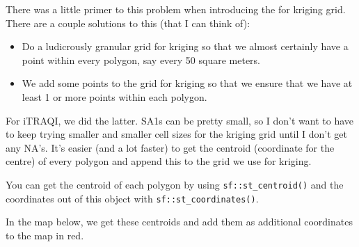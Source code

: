 \documentclass[
]{book}
\providecommand{\tightlist}{%
  \setlength{\itemsep}{0pt}\setlength{\parskip}{0pt}}
\begin{document}
There was a little primer to this problem when introducing the for kriging grid.
There are a couple solutions to this (that I can think of):

\begin{itemize}
\tightlist
\item
  Do a ludicrously granular grid for kriging so that we almost certainly have a point within every polygon, say every 50 square meters.
\item
  We add some points to the grid for kriging so that we ensure that we have at least 1 or more points within each polygon.
\end{itemize}

For iTRAQI, we did the latter. SA1s can be pretty small, so I don't want to have to keep trying smaller and smaller cell sizes for the kriging grid until I don't get any NA's. It's easier (and a lot faster) to get the centroid (coordinate for the centre) of every polygon and append this to the grid we use for kriging.

You can get the centroid of each polygon by using \texttt{sf::st\_centroid()} and the coordinates out of this object with \texttt{sf::st\_coordinates()}.

In the map below, we get these centroids and add them as additional coordinates to the map in red.
\end{document}
